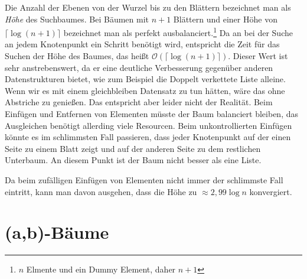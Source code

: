 Die Anzahl der Ebenen von der Wurzel bis zu den Blättern bezeichnet man als \textit{Höhe} des Suchbaumes. Bei Bäumen mit $n+1$ Blättern und einer Höhe von $\lceil \log (n+1) \rceil$ bezeichnet man als perfekt ausbalanciert.\footnote{$n$ Elmente und ein Dummy Element, daher $n+1$} Da an bei der Suche an jedem Knotenpunkt ein Schritt benötigt wird, entspricht die Zeit für das Suchen der Höhe des Baumes, das heißt $\mathcal{O}(\lceil \log (n+1) \rceil)$.\cite{Sanders:19} Dieser Wert ist sehr anstrebenswert, da er eine deutliche Verbesserung gegenüber anderen Datenstrukturen bietet, wie zum Beispiel die Doppelt verkettete Liste alleine. Wenn wir es mit einem gleichbleiben Datensatz zu tun hätten, wäre das ohne Abstriche zu genießen. Das entspricht aber leider nicht der Realität. Beim Einfügen und Entfernen von Elementen müsste der Baum balanciert bleiben, das Ausgleichen benötigt allerding viele Resourcen. Beim unkontrollierten Einfügen könnte es im schlimmsten Fall passieren, dass jeder Knotenpunkt auf der einen Seite zu einem Blatt zeigt und auf der anderen Seite zu dem restlichen Unterbaum. An diesem Punkt ist der Baum nicht besser als eine Liste.
\par
Da beim zufälligen Einfügen von Elementen nicht immer der schlimmste Fall eintritt, kann man davon ausgehen, dass die Höhe zu $\approx 2,99 \log n$ konvergiert. \cite{Sanders:19}


\section{(a,b)-Bäume}
\label{section:ab-trees}

